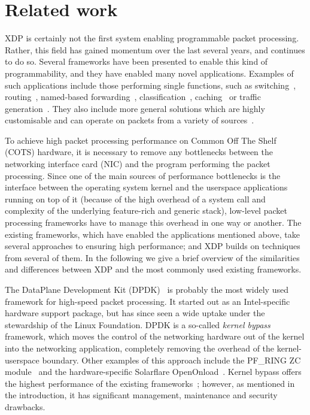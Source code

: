 \documentclass[sigconf]{acmart}
\begin{document}
\section{Related work}%
\label{sec:related-work}

XDP is certainly not the first system enabling programmable packet processing.
Rather, this field has gained momentum over the last several years, and
continues to do so. Several frameworks have been presented to enable this kind
of programmability, and they have enabled many novel applications. Examples of
such applications include those performing single functions, such as
switching~\cite{rizzo2012vale}, routing~\cite{han2010packetshader}, named-based
forwarding~\cite{kirchner2016augustus}, classification~\cite{santiago2012wire},
caching~\cite{mansilha2015hierarchical} or traffic
generation~\cite{emmerich2015moongen}. They also include more general solutions
which are highly customisable and can operate on packets from a variety of
sources~\cite{han2012megapipe,marian2012netslices,linguaglossa2017high,morris1999click,dobrescu2009routebricks,openvswitch}.

To achieve high packet processing performance on Common Off The Shelf (COTS)
hardware, it is necessary to remove any bottlenecks between the networking
interface card (NIC) and the program performing the packet processing. Since one
of the main sources of performance bottlenecks is the interface between the
operating system kernel and the userspace applications running on top of it
(because of the high overhead of a system call and complexity of the underlying
feature-rich and generic stack), low-level packet processing frameworks have to
manage this overhead in one way or another. The existing frameworks, which have
enabled the applications mentioned above, take several approaches to ensuring
high performance; and XDP builds on techniques from several of them. In the
following we give a brief overview of the similarities and differences between
XDP and the most commonly used existing frameworks.

The DataPlane Development Kit (DPDK)~\cite{dpdk} is probably the most widely
used framework for high-speed packet processing. It started out as an
Intel-specific hardware support package, but has since seen a wide uptake under
the stewardship of the Linux Foundation. DPDK is a so-called \emph{kernel
  bypass} framework, which moves the control of the networking hardware out of
the kernel into the networking application, completely removing the overhead of
the kernel-userspace boundary. Other examples of this approach include the
PF\_RING ZC module~\cite{pfringzc} and the hardware-specific Solarflare
OpenOnload~\cite{openonload}. Kernel bypass offers the highest performance of
the existing frameworks~\cite{gallenmuller_comparison_2015}; however, as
mentioned in the introduction, it has significant management, maintenance and
security drawbacks.
\end{document}
